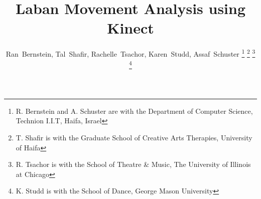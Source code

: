 \documentclass[journal]{journal}
\begin{document}
%
\title{Laban Movement Analysis using Kinect}

\author{Ran~Bernstein, Tal~Shafir, Rachelle~Tsachor, Karen~Studd,
Assaf~Schuster
\thanks{R. Bernstein and A. Schuster are with the Department of Computer
Science, Technion I.I.T, Haifa, Israel}
\thanks{T. Shafir is with the Graduate School of Creative Arts Therapies,
University of Haifa}
\thanks{R. Tsachor is with the School of Theatre \& Music, The University of
Illinois at Chicago}
\thanks{K. Studd is with the School of Dance, George Mason University}}

\maketitle
%
%
%



% 
%



%
% 
\end{document}
